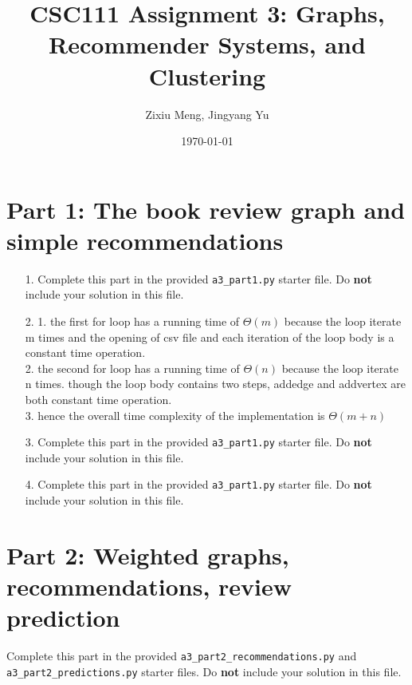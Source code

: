 \documentclass[11pt]{article}
\title{CSC111 Assignment 3: Graphs, Recommender Systems, and Clustering}
\author{Zixiu Meng, Jingyang Yu}
\date{\today}
\begin{document}
    \maketitle

    \section*{Part 1: The book review graph and simple recommendations}

    \begin{enumerate}

        \item[1.]
        Complete this part in the provided \texttt{a3\_part1.py} starter file.
        Do \textbf{not} include your solution in this file.

        \item[2.]
        1. the first for loop has a running time of $\Theta{(m)}$ because the loop iterate m times and the opening of csv file and each iteration of the loop body is a constant time operation.\\
        2. the second for loop has a running time of $\Theta{(n)}$ because the loop iterate n times. though the loop body contains two steps, addedge and addvertex are both constant time operation. \\
        3. hence the overall time complexity of the implementation is $\Theta{(m+n)}$

        \item[3.]
        Complete this part in the provided \texttt{a3\_part1.py} starter file.
        Do \textbf{not} include your solution in this file.

        \item[4.]
        Complete this part in the provided \texttt{a3\_part1.py} starter file.
        Do \textbf{not} include your solution in this file.

    \end{enumerate}

    \section*{Part 2: Weighted graphs, recommendations, review prediction}

    Complete this part in the provided \texttt{a3\_part2\_recommendations.py} and \texttt{a3\_part2\_predictions.py} starter files.
    Do \textbf{not} include your solution in this file.

    \newpage
\end{document}
